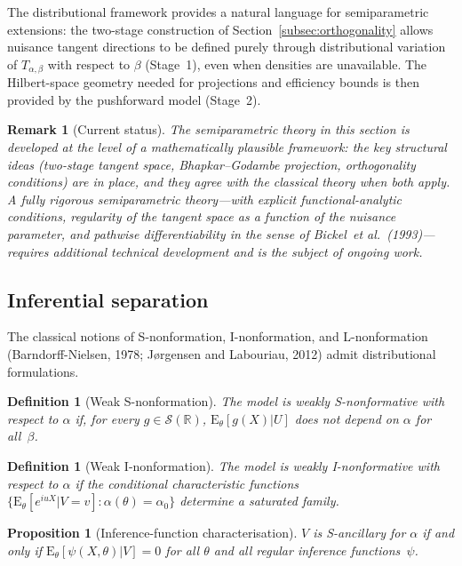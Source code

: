 \documentclass[11pt,a4paper]{article}
\newtheorem{proposition}[theorem]{Proposition}
\newtheorem{definition}[theorem]{Definition}
\newtheorem{remark}[theorem]{Remark}
\newcommand{\E}{\mathrm{E}}
\newcommand{\R}{\mathbb{R}}
\begin{document}
The distributional framework provides a natural language for semiparametric
extensions: the two-stage construction of
Section~\ref{subsec:orthogonality} allows nuisance tangent directions to
be defined purely through distributional variation of $T_{\alpha,\beta}$
with respect to $\beta$ (Stage~1), even when densities are unavailable.
The Hilbert-space geometry needed for projections and efficiency bounds
is then provided by the pushforward model (Stage~2).

\begin{remark}[Current status]\label{rem:semiparametric-status}
The semiparametric theory in this section is developed at the level of a
mathematically plausible framework: the key structural ideas (two-stage
tangent space, Bhapkar--Godambe projection, orthogonality conditions) are
in place, and they agree with the classical theory when both apply.  A
fully rigorous semiparametric theory---with explicit functional-analytic
conditions, regularity of the tangent space as a function of the nuisance
parameter, and pathwise differentiability in the sense of
Bickel~\emph{et al.}~(1993)---requires additional technical development
and is the subject of ongoing work.
\end{remark}

\subsection{Inferential separation}\label{subsec:nonformation}

The classical notions of S-nonformation, I-nonformation, and L-nonformation
(Barndorff-Nielsen, 1978; J{\o}rgensen and Labouriau, 2012) admit
distributional formulations.

\begin{definition}[Weak S-nonformation]\label{def:weak-S}
The model is \emph{weakly S-nonformative} with respect to $\alpha$ if, for
every $g \in \mathcal S(\R)$,
$\E_\theta[g(X) | U]$ does not depend on $\alpha$ for all~$\beta$.
\end{definition}

\begin{definition}[Weak I-nonformation]\label{def:weak-I}
The model is \emph{weakly I-nonformative} with respect to $\alpha$ if the
conditional characteristic functions
$\{\E_\theta[e^{iuX} | V = v] : \alpha(\theta) = \alpha_0\}$
determine a saturated family.
\end{definition}

\begin{proposition}[Inference-function characterisation]\label{prop:IF-ancillarity}
$V$ is S-ancillary for $\alpha$ if and only if
$\E_\theta[\psi(X, \theta) | V] = 0$ for all $\theta$ and all regular
inference functions~$\psi$.
\end{proposition}
\end{document}
